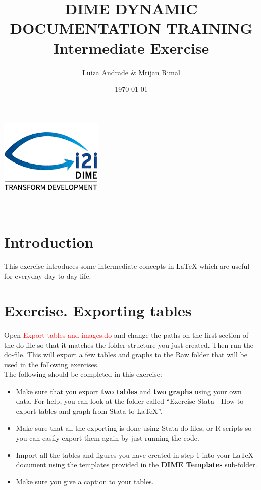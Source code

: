 \documentclass[12pts]{report}
\title{DIME DYNAMIC DOCUMENTATION TRAINING \\ Intermediate Exercise }
\author{Luiza Andrade \& Mrijan Rimal}
\date{\today}
\begin{document}
	
	
	\makeatletter
	\begin{titlepage}
		\begin{center}
			\includegraphics[width=0.3\linewidth]{../img/i2i.png}\\[10ex]
			{\LARGE \bfseries  \@title }\\[2ex] 
			{\Large  \@author}\\[20ex] 
			{\large \@date}
		\end{center}
	\end{titlepage}
	\makeatother
	
\section*{Introduction}
This exercise introduces some intermediate concepts in {\LaTeX} which are useful for everyday day to day life. 

\section*{Exercise. Exporting tables}
Open \textcolor{red}{Export tables and images.do} and change the paths on the first section of the do-file so that it matches the folder structure you just created. Then run the do-file. This will export a few tables and graphs to the Raw folder that will be used in the following exercises.  \\

The following should be completed in this exercise: 
\begin{itemize}
	\item Make sure that you export \textbf{two tables} and \textbf{two graphs} using your own data. For help, you can look at the folder called ``Exercise Stata - How to export tables and graph from Stata to LaTeX''.
	\item Make sure that all the exporting is done using Stata do-files, or R scripts so you can easily export them again by just running the code. 
	\item Import all the tables and figures you have created in step 1 into your {\LaTeX} document using the templates provided in the \textbf{DIME Templates} sub-folder.
	\item Make sure you give a caption to your tables. 
\end{itemize}
\end{document}
